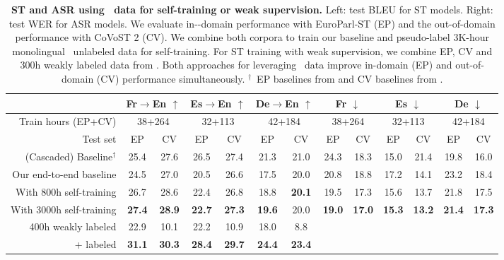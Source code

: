 \begin{table*}[t]
    \centering
    \small
    \begin{tabular}{r|cc|cc|cc||cc|cc|cc}
    \toprule
     & \multicolumn{2}{c|}{Fr$\rightarrow$En $\uparrow$} & \multicolumn{2}{c|}{Es$\rightarrow$En $\uparrow$} & \multicolumn{2}{c||}{De$\rightarrow$En $\uparrow$} & \multicolumn{2}{c|}{Fr $\downarrow$} & \multicolumn{2}{c|}{Es $\downarrow$} & \multicolumn{2}{c}{De $\downarrow$}  \\
     \midrule
     Train hours (EP+CV) & \multicolumn{2}{c|}{38+264} & \multicolumn{2}{c|}{32+113} & \multicolumn{2}{c||}{42+184} & \multicolumn{2}{c|}{38+264} & \multicolumn{2}{c|}{32+113} & \multicolumn{2}{c}{42+184} \\
     Test set & EP & CV & EP & CV & EP & CV & EP & CV & EP & CV & EP & CV \\
    \midrule
    (Cascaded) Baseline$^{\dagger}$ & 25.4 & 27.6 & 26.5 & 27.4 & 21.3 & 21.0 & 24.3 & 18.3 & 15.0 & 21.4 & 19.8 & 16.0 \\
    Our end-to-end baseline & 24.5 & 27.0 & 20.5 & 26.6 & 17.5 & 20.0 & 20.8 & 18.8 & 17.2 & 14.1 & 23.2 & 18.4 \\
    With 800h self-training & 26.7 & 28.6 & 22.4 & 26.8 & 18.8 & \textbf{20.1} & 19.5 & 17.3 & 15.6 & 13.7 & 21.8 & 17.5 \\
    With 3000h self-training & \textbf{27.4} & \textbf{28.9} & \textbf{22.7} & \textbf{27.3} & \textbf{19.6} & 20.0 & \textbf{19.0} & \textbf{17.0} & \textbf{15.3} & \textbf{13.2} & \textbf{21.4} & \textbf{17.3} \\
    \midrule
    400h weakly labeled & 22.9 & 10.1 & 22.2 & 10.9 & 18.0 & 8.8 & \\
    + labeled & \textbf{31.1} & \textbf{30.3} & \textbf{28.4} & \textbf{29.7} & \textbf{24.4} & \textbf{23.4} & \\
    \bottomrule
    \end{tabular}
    \caption{\textbf{ST and ASR using \vp~data for self-training or weak supervision.} Left: test BLEU for ST models. Right: test WER for ASR models. We evaluate in-\vp-domain performance with EuroParl-ST (EP) and the out-of-domain performance with CoVoST 2 (CV). We combine both corpora to train our baseline and pseudo-label 3K-hour monolingual \vp~unlabeled data for self-training.
    For ST training with weak supervision, we combine EP, CV and 300h weakly labeled data from \vp. Both approaches for leveraging \vp~data improve in-domain (EP) and out-of-domain (CV) performance simultaneously. $^\dagger$~EP baselines from \citet{iranzo2020europarl} and CV baselines from \citet{wang2020covost}.}
    \label{tab:st_self_training_eval}
\end{table*}

